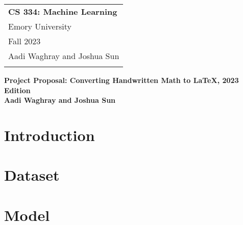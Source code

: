 \documentclass{article}
\begin{document}
\thispagestyle{empty}

\begin{tabular}{p{10.5cm}}
	{\large \bf CS 334: Machine Learning} \\
	Emory University                      \\ Fall 2023  \\ Aadi Waghray and Joshua Sun\\
	\bottomrule
	\\
\end{tabular}

\vspace*{0.3cm}

\begin{center}
	{\Large \bf Project Proposal: Converting Handwritten Math to \LaTeX, 2023 Edition}\\
	\vspace*{0.02cm}
	{\bf Aadi Waghray and Joshua Sun}
\end{center}

\vspace{0.4cm}

\section*{Introduction}


\section*{Dataset}


\section*{Model}


\newpage
\nocite{*}
\printbibliography
\end{document}
